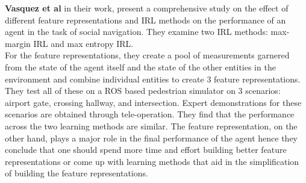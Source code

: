 \textbf{Vasquez et al} in their work, present a comprehensive study on the effect of different feature representations and IRL methods on the performance of an agent in the task of social navigation. They examine two IRL methods:
max-margin IRL and max entropy IRL.\\
For the feature representations, they create a pool of measurements garnered from the state of the agent itself and the state of the other entities in the environment and combine individual entities to create 3 feature representations. \\
They test all of these on a ROS based pedestrian simulator on 3 scenarios: airport gate, crossing hallway, and intersection. Expert demonstrations for these scenarios are obtained through tele-operation. They find that the performance across the two learning methods are similar. The feature representation, on the other hand, plays a major role in the final performance of the agent hence they conclude that one should spend more time and effort building better feature representations or come up with learning methods that aid in the simplification of building the feature representations.\\

